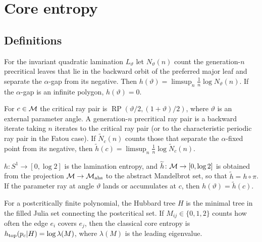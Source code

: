 \section{Core entropy}
\label{sec:digest-core-entropy}

\subsection*{Definitions}

\begin{definition}
\label{def:core-lamination}
For the invariant quadratic lamination $L_\vartheta$ let $N_\vartheta(n)$ count the generation-$n$
precritical leaves that lie in the backward orbit of the preferred major leaf and separate the
$\alpha$-gap from its negative.  Then $h(\vartheta)=\limsup_{n}\frac1n\log N_\vartheta(n)$.  If the
$\alpha$-gap is an infinite polygon, $h(\vartheta)=0$.
\end{definition}

\begin{definition}
\label{def:core-polynomial}
For $c\in\mathcal M$ the critical ray pair is $\operatorname{RP}(\vartheta/2,(1+\vartheta)/2)$, where $\vartheta$ is an
external parameter angle.  A generation-$n$ precritical ray pair is a backward iterate taking $n$ iterates to the
critical ray pair (or to the characteristic periodic ray pair in the Fatou case).  If $\widetilde N_c(n)$ counts those
that separate the $\alpha$-fixed point from its negative, then $\widetilde h(c)=\limsup_n\frac1n\log\widetilde N_c(n)$.
\end{definition}

\begin{definition}
\label{def:core-functions}
$h\colon S^1\to[0,\log2]$ is the lamination entropy, and $\widetilde h\colon\mathcal M\to[0,\log2]$ is obtained from the
projection $\mathcal M\to\mathcal M_{\rm abs}$ to the abstract Mandelbrot set, so that $\widetilde h=h\circ\pi$.  If the parameter ray at
angle $\vartheta$ lands or accumulates at $c$, then $h(\vartheta)=\widetilde h(c)$.
\end{definition}

\begin{definition}
\label{def:core-hubbard}
For a postcritically finite polynomial, the Hubbard tree $H$ is the minimal tree in the filled Julia set connecting
the postcritical set.  If $M_{ij}\in\{0,1,2\}$ counts how often the edge $e_i$ covers $e_j$, then the classical core
entropy is $h_{\rm top}(p_c|H)=\log\lambda(M)$, where $\lambda(M)$ is the leading eigenvalue.
\end{definition}


